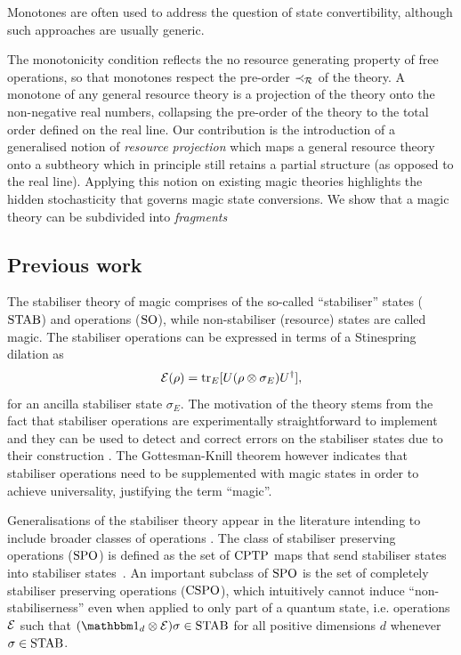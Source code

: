 \documentclass[pra,
aps,
twocolumn,
superscriptaddress,
groupedaddress,
nofootinbib,
reprint
]{revtex4-1}
\begin{document}
Monotones are often used  to address the question of state convertibility, although such approaches are usually generic.

The monotonicity condition reflects the no resource generating property of free operations, so that monotones respect the pre-order $\prec_{\mathcal{R}}$ of the theory.
A monotone of any general resource theory is a projection of the theory onto the non-negative real numbers, collapsing the pre-order of the theory to the total order defined on the real line.
Our contribution is the introduction of a generalised notion of \emph{resource projection} which maps a general resource theory onto a subtheory which in principle still retains a partial structure (as opposed to the real line).
Applying this notion on existing magic theories highlights the hidden stochasticity that governs magic state conversions.
We show that a magic theory can be subdivided into \emph{fragments} 

\subsection{Previous work}
\label{sec:prev}


The stabiliser theory of magic comprises of the so-called ``stabiliser'' states (${\rm{STAB}}$) and operations (${\rm{SO}}$), while non-stabiliser (resource) states are called magic.
The stabiliser operations can be expressed in terms of a Stinespring dilation as 
\begin{equation}
    \mathcal{E}(\rho) = {\rm{tr}}_E [U(\rho \otimes \sigma_E)U^\dagger],
\end{equation} 
for an ancilla stabiliser state $\sigma_E$. 
The motivation of the theory stems from the fact that stabiliser operations are experimentally straightforward to implement and they can be used to detect and correct errors on the stabiliser states due to their construction .
The Gottesman-Knill theorem however indicates that stabiliser operations need to be supplemented with magic states in order to achieve universality, justifying the term ``magic''.

Generalisations of the stabiliser theory appear in the literature intending to include broader classes of operations .
The class of stabiliser preserving operations (${\rm{SPO}}$) is defined as the set of ${\rm{CPTP}}$ maps that send stabiliser states into stabiliser states~\cite{cit:ahmadi}.
An important subclass of ${\rm{SPO}}$ is the set of completely stabiliser preserving operations (${\rm{CSPO}}$), which intuitively cannot induce ``non-stabiliserness'' even when applied to only part of a quantum state, i.e. operations $\mathcal{E}$ such that $(\id_d \otimes \E ) \sigma \in \stab$ for all positive dimensions $d$ whenever $\sigma \in {\rm{STAB}}$.
\end{document}
